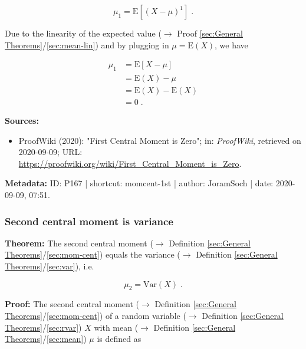 \documentclass[a4paper,12pt,twoside]{book}
\begin{document}
\begin{equation} \label{eq:momcent-1st-momcent-1st-def}
\mu_1 = \mathrm{E}\left[ (X-\mu)^1 \right] \; .
\end{equation}

Due to the linearity of the expected value ($\rightarrow$ Proof \ref{sec:General Theorems}/\ref{sec:mean-lin}) and by plugging in $\mu = \mathrm{E}(X)$, we have

\begin{equation} \label{eq:momcent-1st-momcent-1st-qed}
\begin{split}
\mu_1 &= \mathrm{E}\left[ X-\mu \right] \\
&= \mathrm{E}(X) - \mu \\
&= \mathrm{E}(X) - \mathrm{E}(X) \\
&= 0 \; .
\end{split}
\end{equation}


\vspace{1em}
\textbf{Sources:}
\begin{itemize}
\item ProofWiki (2020): "First Central Moment is Zero"; in: \textit{ProofWiki}, retrieved on 2020-09-09; URL: \url{https://proofwiki.org/wiki/First_Central_Moment_is_Zero}.
\end{itemize}


\vspace{1em}
\textbf{Metadata:} ID: P167 | shortcut: momcent-1st | author: JoramSoch | date: 2020-09-09, 07:51.
\vspace{1em}



\subsubsection[\textbf{Second central moment is variance}]{Second central moment is variance} \label{sec:momcent-2nd}
\setcounter{equation}{0}

\textbf{Theorem:} The second central moment ($\rightarrow$ Definition \ref{sec:General Theorems}/\ref{sec:mom-cent}) equals the variance ($\rightarrow$ Definition \ref{sec:General Theorems}/\ref{sec:var}), i.e.

\begin{equation} \label{eq:momcent-2nd-momcent-2nd}
\mu_2 = \mathrm{Var}(X) \; .
\end{equation}


\vspace{1em}
\textbf{Proof:} The second central moment ($\rightarrow$ Definition \ref{sec:General Theorems}/\ref{sec:mom-cent}) of a random variable ($\rightarrow$ Definition \ref{sec:General Theorems}/\ref{sec:rvar}) $X$ with mean ($\rightarrow$ Definition \ref{sec:General Theorems}/\ref{sec:mean}) $\mu$ is defined as
\end{document}
